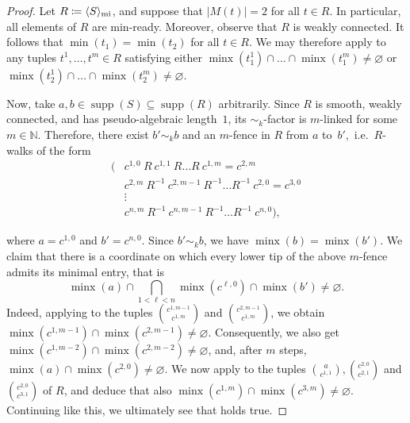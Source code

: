 \documentclass[a4paper,reqno, cleveref]{amsart}
\newcommand{\coloneqq}{\mathrel{\mathop:}\mathrel{\mkern-1.2mu}=}
\newcommand{\N}{\mathbb{N}}
\newcommand{\ignore}[1]{}
\DeclareMathOperator{\supp}{supp}
\DeclareMathOperator{\mi}{mi}
\DeclareMathOperator{\minx}{minx}
\newcommand{\genrel}[2]{\langle{#1}\rangle_{#2}}
\begin{document}
\begin{proof} 
Let $R\coloneqq\genrel{S}{\mi}$, and suppose that $|M(t)|=2$ for all $t \in R$.  In particular, all elements of $R$ are min-ready. Moreover, observe that $R$ is weakly connected. It follows that $\min(t_1)=\min(t_2)$ for all $t \in R$. We may therefore apply  to any tuples $t^1, \dots, t^m \in R$ satisfying either $\minx(t^1_1)\cap\dots\cap\minx(t^m_1)\neq \varnothing$ or $\minx(t^1_2)\cap\dots\cap\minx(t^m_2)\neq \varnothing$.

    Now, take $a,b\in \supp(S)\subseteq \supp(R)$ arbitrarily.
    Since $R$ is smooth, weakly connected, and has pseudo-algebraic length~$1$, its $\sim_{k}$-factor  is  $m$-linked for some $m\in \N$. Therefore, there exist $b' \sim_k b$ and an $m$-fence in $R$ from $a$ to~$b'$,~i.e.~$R$-walks of the form
    \[ \begin{aligned}
        (&c^{1,0}\ R \ c^{1,1}\ R\dots R \ c^{1,m}=c^{2,m} \\
        &c^{2,m}\ R^{-1} \ c^{2,m-1}\ R^{-1}\dots R^{-1} \ c^{2,0}= c^{3,0} \\
        &\vdots \\
        &c^{n,m}\ R^{-1}\ c^{n,m-1}\ R^{-1}\dots R^{-1} \ c^{n,0}),
    \end{aligned}\]
    \ignore{\[ \begin{aligned}
        (&x_{1,0}R x_{1,1}R\dots R x_{1,m}=x_{2,m} \\
        &x_{2,m}R^{-1} x_{2,m-1}R^{-1}\dots R^{-1} x_{2,0}= x_{3,0} \\
        &\vdots \\
        &x_{n,m}R^{-1}x_{n,m-1}R^{-1}\dots R^{-1}x_{n,0}),
    \end{aligned}\]}
    where $a=c^{1,0}$ and $b'=c^{n,0}$. 
    Since $b' \sim_k b$,  
    we have $\minx(b)=\minx(b')$. We claim that there is a coordinate on which every lower tip of the above $m$-fence admits its minimal entry, that is
    \begin{equation}\label{eq:fenceminx}
        \minx(a)\cap\bigcap_{1<\ell < n}\minx(c^{ \ell, 0})\cap\minx(b')\neq \varnothing.
    \end{equation} 
    Indeed, applying  to the tuples $\binom{c^{1,m-1}}{c^{1,m}}$ and $\binom{c^{2,m-1}}{c^{1,m}}$, we obtain $\minx(c^{1,m-1})\cap\minx(c^{2,m-1})\neq\varnothing$. 
    Consequently, we also get $\minx(c^{1,m-2})\cap\minx(c^{2,m-2})\neq\varnothing$, and, after $m$ steps, $\minx(a)\cap\minx(c^{2,0})\neq\varnothing$.
    We now apply  to the tuples $\binom{a}{c^{1,1}},\binom{c^{2,0}}{c^{2,1}}$ and $\binom{c^{2,0}}{c^{3,1}}$ of $R$, and deduce that also $\minx(c^{1,m})\cap\minx(c^{3,m})\neq\varnothing$.
    Continuing like this, we ultimately see that  holds true.


\end{proof}
\end{document}
